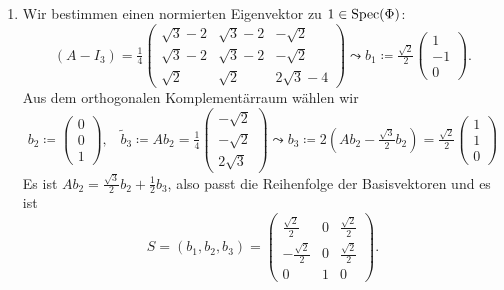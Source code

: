 \begin{enumerate}
	\item Wir bestimmen einen normierten Eigenvektor zu \( 1 \in \text{Spec}(\Phi) \):
	\begin{equation*}
		(A - I_3) = \tfrac{1}{4}\left( \begin{smallmatrix}
			\sqrt{3}-2 & \sqrt{3}-2 & -\sqrt{2} \\
			\sqrt{3}-2 & \sqrt{3}-2 & -\sqrt{2} \\
			\sqrt{2} & \sqrt{2} & 2\sqrt{3}-4
		\end{smallmatrix} \right) \leadsto b_1 \coloneqq \tfrac{\sqrt{2}}{2}\left( \begin{smallmatrix}
			1 \\ -1 \\ 0
		\end{smallmatrix} \right)\text{.}
	\end{equation*}
	Aus dem orthogonalen Komplementärraum wählen wir
	\begin{equation*}
		b_2 \coloneqq \left( \begin{smallmatrix}
			0 \\ 0 \\ 1
		\end{smallmatrix} \right)\text{,} \quad \widetilde{b}_3 \coloneqq Ab_2 = \tfrac{1}{4} \left( \begin{smallmatrix}
			-\sqrt{2} \\ -\sqrt{2} \\ 2\sqrt{3}
		\end{smallmatrix} \right) \leadsto b_3 \coloneqq 2(Ab_2-\tfrac{\sqrt{3}}{2}b_2) = \tfrac{\sqrt{2}}{2}\left( \begin{smallmatrix}
			1 \\ 1 \\ 0
		\end{smallmatrix} \right)\text{}
	\end{equation*}
	Es ist \( Ab_2 = \tfrac{\sqrt{3}}{2}b_2 + \tfrac{1}{2}b_3 \), also passt die Reihenfolge der Basisvektoren und es ist
	\begin{equation*}
		S = (b_1,b_2,b_3) = \begin{pmatrix}
			\tfrac{\sqrt{2}}{2} & 0 & \tfrac{\sqrt{2}}{2} \\
			-\tfrac{\sqrt{2}}{2} & 0 & \tfrac{\sqrt{2}}{2} \\
			0 & 1 & 0
		\end{pmatrix}\text{.}
	\end{equation*}
\end{enumerate}

\newpage

